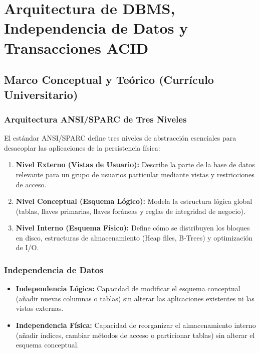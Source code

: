 \chapter{Arquitectura de DBMS, Independencia de Datos y Transacciones ACID}
\label{cap:arquitectura_dbms_acid}

\section{Marco Conceptual y Te\'orico (Curr\'iculo Universitario)}

\subsection{Arquitectura ANSI/SPARC de Tres Niveles}
El est\'andar ANSI/SPARC define tres niveles de abstracci\'on esenciales para desacoplar las aplicaciones de la persistencia f\'isica:
\begin{enumerate}
    \item \textbf{Nivel Externo (Vistas de Usuario):} Describe la parte de la base de datos relevante para un grupo de usuarios particular mediante vistas y restricciones de acceso.
    \item \textbf{Nivel Conceptual (Esquema L\'ogico):} Modela la estructura l\'ogica global (tablas, llaves primarias, llaves for\'aneas y reglas de integridad de negocio).
    \item \textbf{Nivel Interno (Esquema F\'isico):} Define c\'omo se distribuyen los bloques en disco, estructuras de almacenamiento (Heap files, B-Trees) y optimizaci\'on de I/O.
\end{enumerate}

\subsection{Independencia de Datos}
\begin{itemize}
    \item \textbf{Independencia L\'ogica:} Capacidad de modificar el esquema conceptual (a\~nadir nuevas columnas o tablas) sin alterar las aplicaciones existentes ni las vistas externas.
    \item \textbf{Independencia F\'isica:} Capacidad de reorganizar el almacenamiento interno (a\~nadir \'indices, cambiar m\'etodos de acceso o particionar tablas) sin alterar el esquema conceptual.
\end{itemize}

